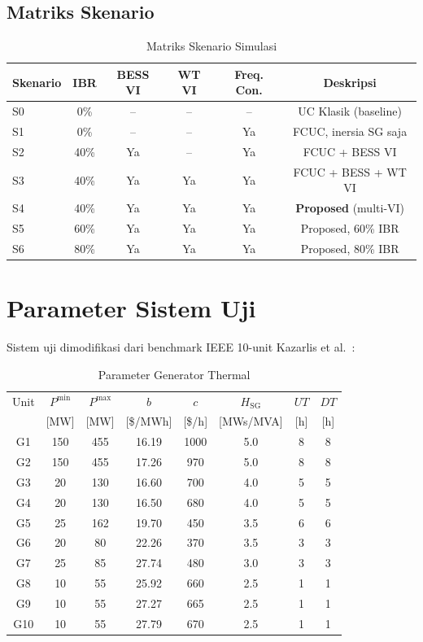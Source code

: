 \documentclass[journal]{IEEEtran}
\begin{document}
\subsection{Matriks Skenario}

\begin{table}[!t]\renewcommand{\arraystretch}{1.2}
\caption{Matriks Skenario Simulasi}
\label{tab:scenarios}
\centering\footnotesize
\begin{tabular}{lccccc}
\toprule
Skenario & IBR & BESS VI & WT VI & Freq. Con. & Deskripsi \\
\midrule
S0 & 0\%  & -- & -- & -- & UC Klasik (baseline) \\
S1 & 0\%  & -- & -- & Ya & FCUC, inersia SG saja \\
S2 & 40\% & Ya & -- & Ya & FCUC + BESS VI \\
S3 & 40\% & Ya & Ya & Ya & FCUC + BESS + WT VI \\
S4 & 40\% & Ya & Ya & Ya & \textbf{Proposed} (multi-VI) \\
S5 & 60\% & Ya & Ya & Ya & Proposed, 60\% IBR \\
S6 & 80\% & Ya & Ya & Ya & Proposed, 80\% IBR \\
\bottomrule
\end{tabular}
\end{table}

\section{Parameter Sistem Uji}
\label{sec:params}

Sistem uji dimodifikasi dari benchmark IEEE 10-unit
Kazarlis et al.~\cite{Kazarlis1996}:

\begin{table}[!t]\renewcommand{\arraystretch}{1.2}
\caption{Parameter Generator Thermal}
\label{tab:gen}
\centering\footnotesize
\begin{tabular}{cccccccc}
\toprule
Unit & $P^{\min}$ & $P^{\max}$ & $b$ & $c$ &
  $H_{\mathrm{SG}}$ & $UT$ & $DT$ \\
 & [MW] & [MW] & [\$/MWh] & [\$/h] & [MWs/MVA] & [h] & [h] \\
\midrule
G1  & 150 & 455 & 16.19 & 1000 & 5.0 & 8 & 8 \\
G2  & 150 & 455 & 17.26 &  970 & 5.0 & 8 & 8 \\
G3  & 20  & 130 & 16.60 &  700 & 4.0 & 5 & 5 \\
G4  & 20  & 130 & 16.50 &  680 & 4.0 & 5 & 5 \\
G5  & 25  & 162 & 19.70 &  450 & 3.5 & 6 & 6 \\
G6  & 20  &  80 & 22.26 &  370 & 3.5 & 3 & 3 \\
G7  & 25  &  85 & 27.74 &  480 & 3.0 & 3 & 3 \\
G8  & 10  &  55 & 25.92 &  660 & 2.5 & 1 & 1 \\
G9  & 10  &  55 & 27.27 &  665 & 2.5 & 1 & 1 \\
G10 & 10  &  55 & 27.79 &  670 & 2.5 & 1 & 1 \\
\bottomrule
\end{tabular}
\end{table}
\end{document}
